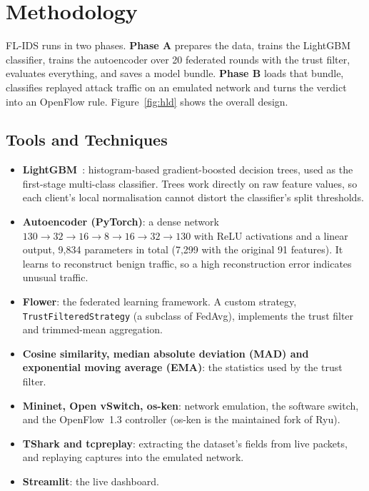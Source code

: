 \chapter{Methodology}\label{chap:method}
FL-IDS runs in two phases. \textbf{Phase A} prepares the data, trains the LightGBM classifier, trains the autoencoder over 20 federated rounds with the trust filter, evaluates everything, and saves a model bundle. \textbf{Phase B} loads that bundle, classifies replayed attack traffic on an emulated network and turns the verdict into an OpenFlow rule. Figure~\ref{fig:hld} shows the overall design.

\section{Tools and Techniques}
\begin{itemize}
  \item \textbf{LightGBM}~\cite{ke2017lightgbm}: histogram-based gradient-boosted decision trees, used as the first-stage multi-class classifier. Trees work directly on raw feature values, so each client's local normalisation cannot distort the classifier's split thresholds.
  \item \textbf{Autoencoder (PyTorch)}: a dense network $130\rightarrow32\rightarrow16\rightarrow8\rightarrow16\rightarrow32\rightarrow130$ with ReLU activations and a linear output, 9{,}834 parameters in total (7{,}299 with the original 91 features). It learns to reconstruct benign traffic, so a high reconstruction error indicates unusual traffic.
  \item \textbf{Flower}: the federated learning framework. A custom strategy, \texttt{TrustFiltered\-Strategy} (a subclass of FedAvg), implements the trust filter and trimmed-mean aggregation.
  \item \textbf{Cosine similarity, median absolute deviation (MAD) and exponential moving average (EMA)}: the statistics used by the trust filter.
  \item \textbf{Mininet, Open vSwitch, os-ken}: network emulation, the software switch, and the OpenFlow~1.3 controller (os-ken is the maintained fork of Ryu).
  \item \textbf{TShark and tcpreplay}: extracting the dataset's fields from live packets, and replaying captures into the emulated network.
  \item \textbf{Streamlit}: the live dashboard.
\end{itemize}

